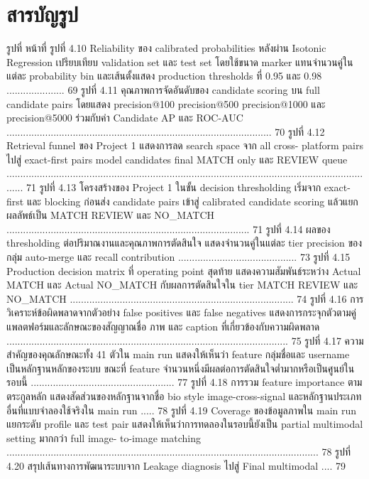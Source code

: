 \documentclass[12pt,a4paper]{report}
\begin{document}
\section*{สารบัญรูป}
รูปที่ หน้าที่ รูปที่ 4.10 Reliability ของ calibrated probabilities หลังผ่าน Isotonic Regression เปรียบเทียบ validation set และ test set โดยใช้ขนาด marker แทนจำนวนคู่ในแต่ละ probability bin และเส้นตั้งแสดง production thresholds ที่ 0.95 และ 0.98 ..................... 69 รูปที่ 4.11 คุณภาพการจัดอันดับของ candidate scoring บน full candidate pairs โดยแสดง precision@100 precision@500 precision@1000 และ precision@5000 ร่วมกับค่า Candidate AP และ ROC-AUC ................................................................................................ 70 รูปที่ 4.12 Retrieval funnel ของ Project 1 แสดงการลด search space จาก all cross- platform pairs ไปสู่ exact-first pairs model candidates final MATCH only และ REVIEW queue ....................................................................................................................................... 71 รูปที่ 4.13 โครงสร้างของ Project 1 ในขั้น decision thresholding เริ่มจาก exact-first และ blocking ก่อนส่ง candidate pairs เข้าสู่ calibrated candidate scoring แล้วแยกผลลัพธ์เป็น MATCH REVIEW และ NO\_MATCH ........................................................................................ 71 รูปที่ 4.14 ผลของ thresholding ต่อปริมาณงานและคุณภาพการตัดสินใจ แสดงจำนวนคู่ในแต่ละ tier precision ของกลุ่ม auto-merge และ recall contribution ........................................... 73 รูปที่ 4.15 Production decision matrix ที่ operating point สุดท้าย แสดงความสัมพันธ์ระหว่าง Actual MATCH และ Actual NO\_MATCH กับผลการตัดสินใจใน tier MATCH REVIEW และ NO\_MATCH ................................................................................. 74 รูปที่ 4.16 การวิเคราะห์ข้อผิดพลาดจากตัวอย่าง false positives และ false negatives แสดงการกระจุกตัวตามคู่แพลตฟอร์มและลักษณะของสัญญาณชื่อ ภาพ และ caption ที่เกี่ยวข้องกับความผิดพลาด ...................................................................................................... 75 รูปที่ 4.17 ความสำคัญของคุณลักษณะทั้ง 41 ตัวใน main run แสดงให้เห็นว่า feature กลุ่มชื่อและ username เป็นหลักฐานหลักของระบบ ขณะที่ feature จำนวนหนึ่งมีผลต่อการตัดสินใจต่ำมากหรือเป็นศูนย์ในรอบนี้ .................................................... 77 รูปที่ 4.18 การรวม feature importance ตามตระกูลหลัก แสดงสัดส่วนของหลักฐานจากชื่อ bio style image-cross-signal และหลักฐานประเภทอื่นที่แบบจำลองใช้จริงใน main run ..... 78 รูปที่ 4.19 Coverage ของข้อมูลภาพใน main run แยกระดับ profile และ test pair แสดงให้เห็นว่าการทดลองในรอบนี้ยังเป็น partial multimodal setting มากกว่า full image- to-image matching ................................................................................................................. 78 รูปที่ 4.20 สรุปเส้นทางการพัฒนาระบบจาก Leakage diagnosis ไปสู่ Final multimodal .... 79\par
\clearpage
\end{document}
